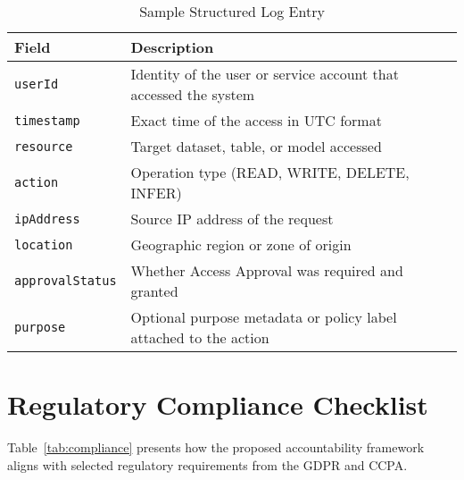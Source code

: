 \documentclass[acmsmall]{acmart}
\begin{document}
\begin{table}[H]
\centering
\caption{Sample Structured Log Entry}
\label{tab:accesslog}
\begin{tabular}{|l|p{8cm}|}
\hline
\textbf{Field} & \textbf{Description} \\
\hline
\texttt{userId} & Identity of the user or service account that accessed the system \\
\hline
\texttt{timestamp} & Exact time of the access in UTC format \\
\hline
\texttt{resource} & Target dataset, table, or model accessed \\
\hline
\texttt{action} & Operation type (READ, WRITE, DELETE, INFER) \\
\hline
\texttt{ipAddress} & Source IP address of the request \\
\hline
\texttt{location} & Geographic region or zone of origin \\
\hline
\texttt{approvalStatus} & Whether Access Approval was required and granted \\
\hline
\texttt{purpose} & Optional purpose metadata or policy label attached to the action \\
\hline
\end{tabular}
\end{table}


\section{Regulatory Compliance Checklist}

Table~\ref{tab:compliance} presents how the proposed accountability framework aligns with selected regulatory requirements from the GDPR and CCPA.
\end{document}
